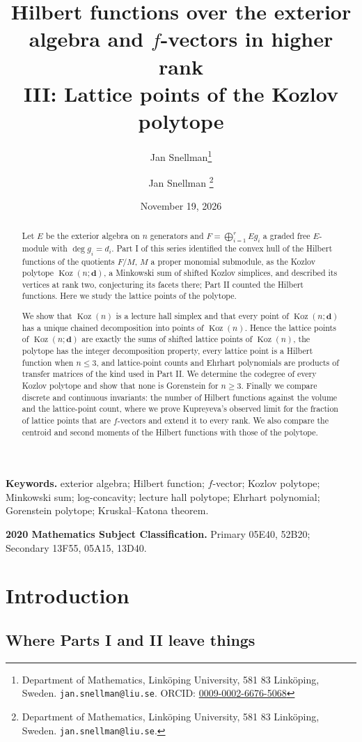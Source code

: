 \documentclass[11pt, a4paper, abstract=yes]{scrartcl}
\author{Jan Snellman\thanks{Department of Mathematics, Linköping University, 581 83 Linköping, Sweden. \texttt{jan.snellman@liu.se}. ORCID: \href{https://orcid.org/0009-0002-6676-5068}{0009-0002-6676-5068}}}
\author{Jan Snellman \orcidlink{0009-0002-6676-5068}\thanks{Department of Mathematics, Linköping University, 581 83 Linköping, Sweden. \texttt{jan.snellman@liu.se}.}}
\date{November 19, 2026}
\title{Hilbert functions over the exterior algebra and \(f\)-vectors in higher rank\\\medskip
\large III: Lattice points of the Kozlov polytope}
\theoremstyle{definition}
\theoremstyle{remark}
\theoremstyle{plain}
\newcommand{\vek}[1]{\boldsymbol{#1}}
\theoremstyle{remark}
\theoremstyle{plain}
\newcommand{\Koz}{\operatorname{Koz}}
\begin{document}
\maketitle
\begin{abstract}
Let \(E\) be the exterior algebra on \(n\) generators and \(F=\bigoplus_{i=1}^rEg_i\) a graded free
\(E\)-module with \(\deg g_i=d_i\). Part I of this series identified the convex hull of the Hilbert
functions of the quotients \(F/M\), \(M\) a proper monomial submodule, as the Kozlov polytope
\(\Koz(n;\vek d)\), a Minkowski sum of shifted Kozlov simplices, and described its vertices at
rank two, conjecturing its facets there; Part II counted the Hilbert functions. Here we study the
lattice points of the polytope.

We show that
\(\Koz(n)\) is a lecture hall simplex and that every point of \(\Koz(n;\vek d)\) has a unique
chained decomposition into points of \(\Koz(n)\). Hence the lattice points of \(\Koz(n;\vek d)\) are
exactly the sums of shifted lattice points of \(\Koz(n)\), the polytope has the integer
decomposition property, every lattice point is a Hilbert function when \(n\le3\), and lattice-point
counts and Ehrhart polynomials are products of transfer matrices of the kind used in Part II. We
determine the codegree of every Kozlov polytope and show that none is Gorenstein for \(n\ge3\).
Finally we compare discrete and continuous invariants: the number of Hilbert functions against the
volume and the lattice-point count, where we prove Kupreyeva's observed limit for the fraction of
lattice points that are \(f\)-vectors and extend it to every rank. We also compare the centroid and
second moments of the Hilbert functions with those of the polytope.
\end{abstract}

\medskip\noindent\textbf{Keywords.} exterior algebra; Hilbert function; \(f\)-vector; Kozlov
polytope; Minkowski sum; log-concavity; lecture hall
polytope; Ehrhart polynomial; Gorenstein polytope; Kruskal--Katona theorem.

\smallskip\noindent\textbf{2020 Mathematics Subject Classification.} Primary 05E40, 52B20;
Secondary 13F55, 05A15, 13D40.
\medskip

\setcounter{tocdepth}{2}
\tableofcontents
\section{Introduction}
\label{sec-intro}
\subsection{Where Parts I and II leave things}
\label{sec:org8b31deb}
\end{document}
